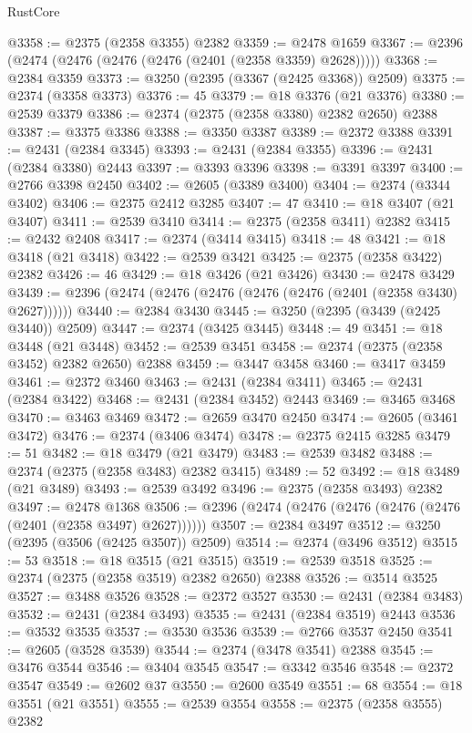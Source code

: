 \begin{lexlean}{RustCore}
\begin{coremodule}
@3358 := @2375 (@2358 @3355) @2382
@3359 := @2478 @1659
@3367 := @2396 (@2474 (@2476 (@2476 (@2476 (@2401 (@2358 @3359) @2628)))))
@3368 := @2384 @3359
@3373 := @3250 (@2395 (@3367 (@2425 @3368)) @2509)
@3375 := @2374 (@3358 @3373)
@3376 := 45
@3379 := @18 @3376 (@21 @3376)
@3380 := @2539 @3379
@3386 := @2374 (@2375 (@2358 @3380) @2382 @2650) @2388
@3387 := @3375 @3386
@3388 := @3350 @3387
@3389 := @2372 @3388
@3391 := @2431 (@2384 @3345)
@3393 := @2431 (@2384 @3355)
@3396 := @2431 (@2384 @3380) @2443
@3397 := @3393 @3396
@3398 := @3391 @3397
@3400 := @2766 @3398 @2450
@3402 := @2605 (@3389 @3400)
@3404 := @2374 (@3344 @3402)
@3406 := @2375 @2412 @3285
@3407 := 47
@3410 := @18 @3407 (@21 @3407)
@3411 := @2539 @3410
@3414 := @2375 (@2358 @3411) @2382
@3415 := @2432 @2408
@3417 := @2374 (@3414 @3415)
@3418 := 48
@3421 := @18 @3418 (@21 @3418)
@3422 := @2539 @3421
@3425 := @2375 (@2358 @3422) @2382
@3426 := 46
@3429 := @18 @3426 (@21 @3426)
@3430 := @2478 @3429
@3439 := @2396 (@2474 (@2476 (@2476 (@2476 (@2476 (@2401 (@2358 @3430) @2627))))))
@3440 := @2384 @3430
@3445 := @3250 (@2395 (@3439 (@2425 @3440)) @2509)
@3447 := @2374 (@3425 @3445)
@3448 := 49
@3451 := @18 @3448 (@21 @3448)
@3452 := @2539 @3451
@3458 := @2374 (@2375 (@2358 @3452) @2382 @2650) @2388
@3459 := @3447 @3458
@3460 := @3417 @3459
@3461 := @2372 @3460
@3463 := @2431 (@2384 @3411)
@3465 := @2431 (@2384 @3422)
@3468 := @2431 (@2384 @3452) @2443
@3469 := @3465 @3468
@3470 := @3463 @3469
@3472 := @2659 @3470 @2450
@3474 := @2605 (@3461 @3472)
@3476 := @2374 (@3406 @3474)
@3478 := @2375 @2415 @3285
@3479 := 51
@3482 := @18 @3479 (@21 @3479)
@3483 := @2539 @3482
@3488 := @2374 (@2375 (@2358 @3483) @2382 @3415)
@3489 := 52
@3492 := @18 @3489 (@21 @3489)
@3493 := @2539 @3492
@3496 := @2375 (@2358 @3493) @2382
@3497 := @2478 @1368
@3506 := @2396 (@2474 (@2476 (@2476 (@2476 (@2476 (@2401 (@2358 @3497) @2627))))))
@3507 := @2384 @3497
@3512 := @3250 (@2395 (@3506 (@2425 @3507)) @2509)
@3514 := @2374 (@3496 @3512)
@3515 := 53
@3518 := @18 @3515 (@21 @3515)
@3519 := @2539 @3518
@3525 := @2374 (@2375 (@2358 @3519) @2382 @2650) @2388
@3526 := @3514 @3525
@3527 := @3488 @3526
@3528 := @2372 @3527
@3530 := @2431 (@2384 @3483)
@3532 := @2431 (@2384 @3493)
@3535 := @2431 (@2384 @3519) @2443
@3536 := @3532 @3535
@3537 := @3530 @3536
@3539 := @2766 @3537 @2450
@3541 := @2605 (@3528 @3539)
@3544 := @2374 (@3478 @3541) @2388
@3545 := @3476 @3544
@3546 := @3404 @3545
@3547 := @3342 @3546
@3548 := @2372 @3547
@3549 := @2602 @37
@3550 := @2600 @3549
@3551 := 68
@3554 := @18 @3551 (@21 @3551)
@3555 := @2539 @3554
@3558 := @2375 (@2358 @3555) @2382

\end{coremodule}
\end{lexlean}
